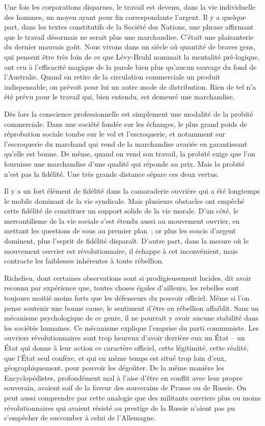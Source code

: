 \documentclass[french,twoside]{book} %
\begin{document}
Une fois les corporations disparues, le travail est devenu, dans la vie individuelle des hommes, un moyen ayant pour fin correspondante l'argent. Il y a quelque part, dans les textes constitutifs de la Société des Nations, une phrase affirmant que le travail désormais ne serait plus une marchandise. C'était une plaisanterie du dernier mauvais goût. Nous vivons dans un siècle où quantité de braves gens, qui pensent être très loin de ce que Lévy-Bruhl nommait la mentalité pré-logique, ont cru à l'efficacité magique de la parole bien plus qu'aucun sauvage du fond de l'Australie. Quand on retire de la circulation commerciale un produit indispensable, on prévoit pour lui un autre mode de distribution. Rien de tel n'a été prévu pour le travail qui, bien entendu, est demeuré une marchandise.\par
Dès lors la conscience professionnelle est simplement une modalité de la probité commerciale. Dans une société fondée sur les échanges, le plus grand poids de réprobation sociale tombe sur le vol et l'escroquerie, et notamment sur l'escroquerie du marchand qui vend de la marchandise avariée en garantissant qu'elle est bonne. De même, quand on vend son travail, la probité exige que l'on fournisse une marchandise d'une qualité qui réponde au prix. Mais la probité n'est pas la fidélité. Une très grande distance sépare ces deux vertus.\par
Il y a un fort élément de fidélité dans la camaraderie ouvrière qui a été longtemps le mobile dominant de la vie syndicale. Mais plusieurs obstacles ont empêché cette fidélité de constituer un support solide de la vie morale. D'un côté, le mercantilisme de la vie sociale s'est étendu aussi au mouvement ouvrier, en mettant les questions de sous au premier plan ; or plus les soucis d'argent dominent, plus l'esprit de fidélité disparaît. D'autre part, dans la mesure où le mouvement ouvrier est révolutionnaire, il échappe à cet inconvénient, mais contracte les faiblesses inhérentes à toute rébellion.\par
Richelieu, dont certaines observations sont si prodigieusement lucides, dit avoir reconnu par expérience que, toutes choses égales d'ailleurs, les rebelles sont toujours moitié moins forts que les défenseurs du pouvoir officiel. Même si l'on pense soutenir une bonne cause, le sentiment d'être en rébellion affaiblit. Sans un mécanisme psychologique de ce genre, il ne pourrait y avoir aucune stabilité dans les sociétés humaines. Ce mécanisme explique l'emprise du parti communiste. Les ouvriers révolutionnaires sont trop heureux d'avoir derrière eux un État – un État qui donne à leur action ce caractère officiel, cette légitimité, cette réalité, que l'État seul confère, et qui en même temps est situé trop loin d'eux, géographiquement, pour pouvoir les dégoûter. De la même manière les Encyclopédistes, profondément mal à l'aise d'être en conflit avec leur propre souverain, avaient soif de la faveur des souverains de Prusse ou de Russie. On peut aussi comprendre par cette analogie que des militants ouvriers plus ou moins révolutionnaires qui avaient résisté au prestige de la Russie n'aient pas pu s’empêcher de succomber à celui de l'Allemagne.\par
\end{document}
